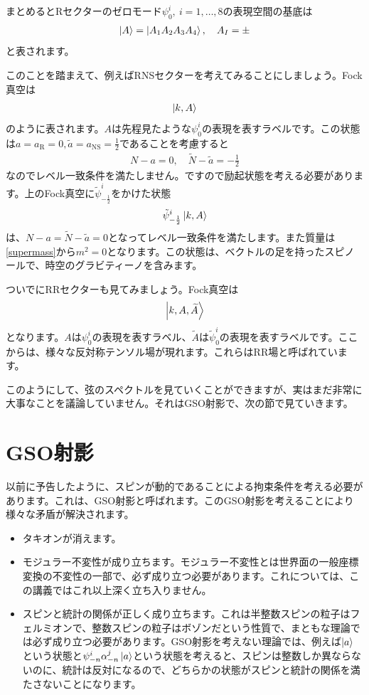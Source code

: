 \documentclass[report,paper=a4, fontsize=12pt, line_length=16cm, number_of_lines=34,dvipdfmx]{jlreq}
\numberwithin{equation}{chapter}
\numberwithin{equation}{section}
\newcommand{\Nt}{\widetilde{N}}
\newcommand{\at}{\tilde{a}}
\newcommand{\At}{\widetilde{A}}
\newcommand{\psit}{\tilde{\psi}}
\newcommand{\aNS}{a_{\mathrm{NS}}}
\newcommand{\aR}{a_{\mathrm{R}}}
\begin{document}
まとめるとRセクターのゼロモード$\psi^{i}_{0},\ i=1,\dots,8$の表現空間の基底は
\begin{align}
  \ket{A}=\ket{A_1A_2A_3A_4},\quad A_I=\pm
\end{align}
と表されます。

このことを踏まえて、例えばRNSセクターを考えてみることにしましょう。Fock真空は
\begin{align}
  \ket{k,A}
\end{align}
のように表されます。$A$は先程見たような$\psi^{i}_{0}$の表現を表すラベルです。この状態は$a=\aR=0,\at=\aNS=\frac12$であることを考慮すると
\begin{align}
  N-a=0,\quad \Nt-\at=-\frac12
\end{align}
なのでレベル一致条件を満たしません。ですので励起状態を考える必要があります。上のFock真空に$\psit^{i}_{-\frac12}$をかけた状態
\begin{align}
  \psit^{i}_{-\frac12}\ket{k,A}
\end{align}
は、$N-a=\Nt-\at=0$となってレベル一致条件を満たします。また質量は\eqref{supermass}から$m^2=0$となります。この状態は、ベクトルの足を持ったスピノールで、時空のグラビティーノを含みます。

ついでにRRセクターも見てみましょう。Fock真空は
\begin{align}
  \ket{k,A,\At}
\end{align}
となります。$A$は$\psi^{i}_{0}$の表現を表すラベル、$\At$は$\psit^{i}_{0}$の表現を表すラベルです。ここからは、様々な反対称テンソル場が現れます。これらはRR場と呼ばれています。

このようにして、弦のスペクトルを見ていくことができますが、実はまだ非常に大事なことを議論していません。それはGSO射影で、次の節で見ていきます。

\section{GSO射影}

以前に予告したように、スピンが動的であることによる拘束条件を考える必要があります。これは、GSO射影と呼ばれます。このGSO射影を考えることにより様々な矛盾が解決されます。
\begin{itemize}
  \item タキオンが消えます。
  \item モジュラー不変性が成り立ちます。モジュラー不変性とは世界面の一般座標変換の不変性の一部で、必ず成り立つ必要があります。これについては、この講義ではこれ以上深く立ち入りません。
  \item スピンと統計の関係が正しく成り立ちます。これは半整数スピンの粒子はフェルミオンで、整数スピンの粒子はボゾンだという性質で、まともな理論では必ず成り立つ必要があります。GSO射影を考えない理論では、例えば$\ket{a}$という状態と$\psi_{-n}^{i}\alpha_{-n}^{j}\ket{a}$という状態を考えると、スピンは整数しか異ならないのに、統計は反対になるので、どちらかの状態がスピンと統計の関係を満たさないことになります。
\end{itemize}
\end{document}
